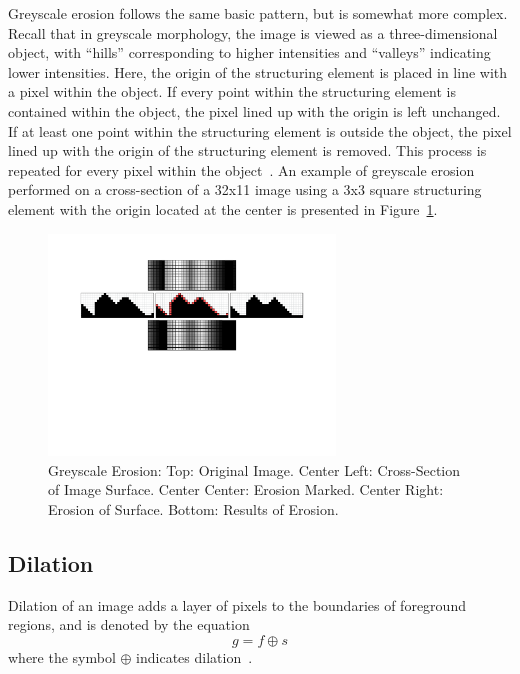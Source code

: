 \documentclass{sig-alternate}
\begin{document}
Greyscale erosion follows the same basic pattern, but is somewhat more complex. Recall that in greyscale morphology, the image is viewed as a three-dimensional object, with ``hills'' corresponding to higher intensities and ``valleys'' indicating lower intensities. Here, the origin of the structuring element is placed in line with a pixel within the object. If every point within the structuring element is contained within the object, the pixel lined up with the origin is left unchanged. If at least one point within the structuring element is outside the object, the pixel lined up with the origin of the structuring element is removed. This process is repeated for every pixel within the object~\cite{MorphologyPaper:1987, MorphologyWiki}. An example of greyscale erosion performed on a cross-section of a 32x11 image using a 3x3 square structuring element with the origin located at the center is presented in Figure~\ref{greyscale erosion figure}.
\begin{figure}
\centering
\includegraphics[width=3in,trim={0 4in 0 0},clip]{greyscale_erosion}
\caption{Greyscale Erosion: Top: Original Image. Center Left: Cross-Section of Image Surface. Center Center: Erosion Marked. Center Right: Erosion of Surface. Bottom: Results of Erosion.}
\label{greyscale erosion figure}
\end{figure}

\subsection{Dilation}\label{dilation}
Dilation of an image adds a layer of pixels to the boundaries of foreground regions, and is denoted by the equation
\begin{equation*}
g = f \oplus s
\end{equation*}
where the symbol $\oplus$ indicates dilation~\cite{MorphologyWikiAnonymous, MorphologyBook:2000}.
\end{document}
